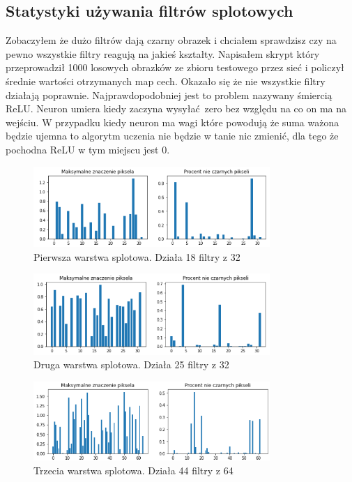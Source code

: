 \documentclass{article}
\begin{document}
\subsection{Statystyki używania filtrów splotowych}
Zobaczyłem że dużo filtrów dają czarny obrazek i chciałem sprawdzisz czy na pewno wszystkie filtry reagują na jakieś kształty. Napisałem skrypt który przeprowadził 1000 losowych obrazków ze zbioru testowego przez sieć i policzył średnie wartości otrzymanych map cech. Okazało się że nie wszystkie filtry działają poprawnie. Najprawdopodobniej jest to problem nazywany śmiercią ReLU. Neuron umiera kiedy zaczyna wysyłać zero bez względu na co on ma na wejściu. W przypadku kiedy neuron ma wagi które powodują że suma ważona będzie ujemna to algorytm uczenia nie będzie w tanie nic zmienić, dla tego że pochodna ReLU w tym miejscu jest 0. \cite{geron}

\begin{figure}[H]
	\centering
	\includegraphics[width=0.8\textwidth,keepaspectratio=true]{statystyka_warstwy_1}
	\caption{Pierwsza warstwa splotowa. Działa 18 filtry z 32}
	\label{statystyka_warstwy_1}
\end{figure}

\begin{figure}[H]
	\centering
	\includegraphics[width=0.8\textwidth,keepaspectratio=true]{statystyka_warstwy_2}
	\caption{Druga warstwa splotowa. Działa 25 filtry z 32}
	\label{statystyka_warstwy_2}
\end{figure}

\begin{figure}[H]
	\centering
	\includegraphics[width=0.8\textwidth,keepaspectratio=true]{statystyka_warstwy_3}
	\caption{Trzecia warstwa splotowa. Działa 44 filtry z 64}
	\label{statystyka_warstwy_3}
\end{figure}
\end{document}
